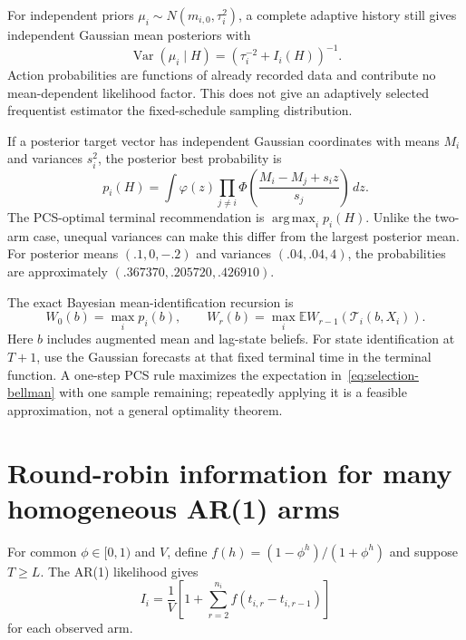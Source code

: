 \documentclass[11pt]{article}
\newcommand{\E}{\mathbb E}
\newcommand{\Var}{\operatorname{Var}}
\newcommand{\argmax}{\operatorname*{arg\,max}}
\begin{document}
For independent priors $\mu_i\sim N(m_{i,0},\tau_i^2)$, a complete adaptive history still gives independent Gaussian mean posteriors with
\begin{equation}
\Var(\mu_i\mid H)=(\tau_i^{-2}+I_i(H))^{-1}.
\end{equation}
Action probabilities are functions of already recorded data and contribute no mean-dependent likelihood factor. This does not give an adaptively selected frequentist estimator the fixed-schedule sampling distribution.

If a posterior target vector has independent Gaussian coordinates with means $M_i$ and variances $s_i^2$, the posterior best probability is
\begin{equation}
p_i(H)=\int\varphi(z)\prod_{j\ne i}
\Phi\left(\frac{M_i-M_j+s_iz}{s_j}\right)\,dz.
\label{eq:posterior-pcs}
\end{equation}
The PCS-optimal terminal recommendation is $\argmax_i p_i(H)$. Unlike the two-arm case, unequal variances can make this differ from the largest posterior mean. For posterior means $(.1,0,-.2)$ and variances $(.04,.04,4)$, the probabilities are approximately $(.367370,.205720,.426910)$.

The exact Bayesian mean-identification recursion is
\begin{equation}
W_0(b)=\max_i p_i(b),\qquad
W_r(b)=\max_i\E W_{r-1}(\mathcal T_i(b,X_i)).
\label{eq:selection-bellman}
\end{equation}
Here $b$ includes augmented mean and lag-state beliefs. For state identification at $T+1$, use the Gaussian forecasts at that fixed terminal time in the terminal function. A one-step PCS rule maximizes the expectation in~\eqref{eq:selection-bellman} with one sample remaining; repeatedly applying it is a feasible approximation, not a general optimality theorem.

\section{Round-robin information for many homogeneous AR(1) arms}
For common $\phi\in[0,1)$ and $V$, define $f(h)=(1-\phi^h)/(1+\phi^h)$ and suppose $T\geq L$. The AR(1) likelihood gives
\[
I_i=\frac1V\left[1+\sum_{r=2}^{n_i}f(t_{i,r}-t_{i,r-1})\right]
\]
for each observed arm.
\end{document}
